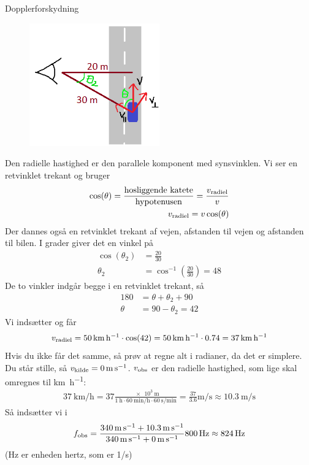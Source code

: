 \documentclass[crop=false, class=memoir]{standalone}
\begin{document}
\begin{opgave}{Dopplerforskydning}
	\opg 
	\begin{figure}[h!]
		\centering
		\includegraphics[width=0.5\textwidth]{Kosmo/kosmofig/PolitiLoesning.png}
	\end{figure}
	\opg Den radielle hastighed er den parallele komponent med synsvinklen. Vi ser en retvinklet trekant og bruger
	\begin{align}
		\cos(\theta)=\frac{\text{hosliggende katete}}{\text{hypotenusen}}=\frac{v_\textup{radiel}}{v} \\
		v_\textup{radiel}=v \cos(\theta)
	\end{align}
	Der dannes også en retvinklet trekant af vejen, afstanden til vejen og afstanden til bilen. I grader giver det en vinkel på
	\begin{align}
		\cos(\theta_2)&=\frac{20}{30}\\
		\theta_2 &= \cos^{-1} \left( \frac{20}{30} \right) = 48
	\end{align}
	De to vinkler indgår begge i en retvinklet trekant, så
	\begin{align}
		180 &= \theta + \theta_2 + 90\\
		\theta &= 90 - \theta_2  = 42
	\end{align}
	Vi indsætter og får
	\begin{align}
	v_\textup{radiel} = \SI{50}{\kilo\meter\per\hour} \cdot \cos(42) = \SI{50}{\kilo\meter\per\hour} \cdot \num{0.74} = \SI{37}{\kilo\meter\per\hour}
	\end{align}
	Hvis du ikke får det samme, så prøv at regne alt i radianer, da det er simplere.
	\opg 
	Du står stille, så $v_\textup{kilde} = \SI{0}{\meter\per\second}$. $v_\textup{obs}$ er den radielle hastighed, som lige skal omregnes til \si{\kilo\meter\per\hour}:
	\begin{align}
	\SI{37}{\kilo\meter\per\hour} = 37 \frac{\SI{e3}{\meter}}{\SI{1}{\hour} \cdot \SI{60}{\minute\per\hour} \cdot \SI{60}{\second\per\minute}} = \frac{37}{\num{3.6}} \si{\meter\per\second} \approx \SI{10.3}{\meter\per\second}
	\end{align}
	Så indsætter vi i
	\begin{align}
	f_\textup{obs} = \frac{\SI{340}{\meter\per\second} + \SI{10.3}{\meter\per\second}}{\SI{340}{\meter\per\second} + \SI{0}{\meter\per\second}} \SI{800}{\hertz} \approx \SI{824}{\hertz}
	\end{align}
    (Hz er enheden hertz, som er 1/s)
\end{opgave}
\end{document}
